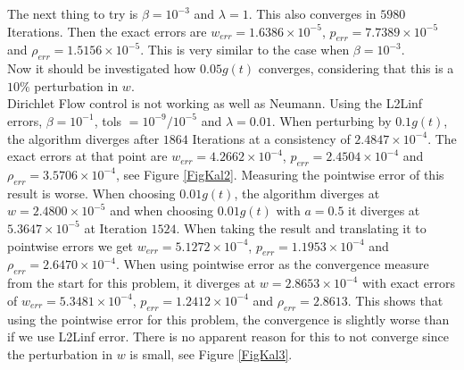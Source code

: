 \documentclass[11pt, a4paper]{article}
\theoremstyle{definition}
\begin{document}
The next thing to try is $\beta = 10^{-3}$ and $\lambda =1$. This also converges in $5980$ Iterations. Then the exact errors are $w_{err}=1.6386 \times 10^{-5}$, $p_{err}=7.7389 \times 10^{-5}$ and $\rho_{err} = 1.5156 \times 10^{-5}$. This is very similar to the case when $\beta =10^{-3}$.\\
Now it should be investigated how $0.05g(t)$ converges, considering that this is a $10\%$ perturbation in $w$.\\


Dirichlet Flow control is not working as well as Neumann. Using the L2Linf errors, $\beta =10^{-1}$, tols $=10^{-9}/10^{-5}$ and $\lambda =0.01$. When perturbing by $0.1 g(t)$, the algorithm diverges after $1864$ Iterations at a consistency of $2.4847 \times 10^{-4}$. The exact errors at that point are  $w_{err} = 4.2662 \times 10^{-4}$, $p_{err}= 2.4504 \times 10^{-4}$ and $\rho_{err} = 3.5706 \times 10^{-4}$, see Figure \ref{FigKal2}. Measuring the pointwise error of this result is worse. 
When choosing $0.01g(t)$, the algorithm diverges at $w=2.4800 \times 10^{-5}$ and when choosing $0.01g(t)$ with $a=0.5$ it diverges at $5.3647 \times 10^{-5}$ at Iteration $1524$. When taking the result and translating it to pointwise errors we get $w_{err} = 5.1272 \times 10^{-4}$, $p_{err}=1.1953 \times 10^{-4}$ and $\rho_{err}= 2.6470 \times 10^{-4}$.
When using pointwise error as the convergence measure from the start for this problem, it diverges at $w= 2.8653 \times 10^{-4}$ with exact errors of $w_{err}=5.3481 \times 10^{-4}$, $p_{err}=1.2412 \times 10^{-4}$ and $\rho_{err}=2.8613$. This shows that using the pointwise error for this problem, the convergence is slightly worse than if we use L2Linf error. There is no apparent reason for this to not converge since the perturbation in $w$ is small, see Figure \ref{FigKal3}.
\end{document}
